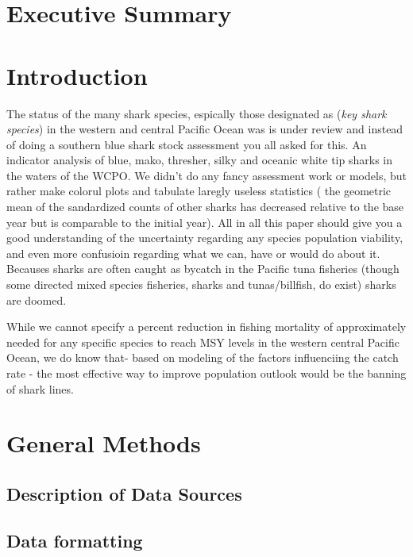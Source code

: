 \documentclass[12pt]{article}
\begin{document}
\wcpfctitlepage

\section*{Executive Summary}


\section{Introduction}
The status of the many  shark species, espically those designated as  (\emph{key shark species}) in the western and central Pacific Ocean was is under review and instead of doing a southern blue shark stock assessment you all asked for this. An indicator analysis of blue, mako, thresher, silky and oceanic white tip sharks in the waters of the WCPO. 
  We didn't do any fancy assessment work or models, but rather make colorul plots and tabulate laregly useless statistics ( the geometric mean of the sandardized counts of other sharks has decreased relative to the base year but is comparable to the initial year).  All in all this paper should give you a good understanding of the uncertainty regarding any species population viability, and even more confusioin regarding what we can, have or would do about it.  Becauses sharks are often caught as bycatch in the Pacific tuna fisheries (though some directed mixed species fisheries, sharks and tunas/billfish, do exist) sharks are doomed.
  
  While we cannot specify a percent  reduction in fishing mortality  of approximately  needed for any specific  species to reach  MSY levels in the western central Pacific Ocean, we do know that-  based on modeling of the factors influenciing the catch rate - the most effective way to improve population outlook   would be the banning of shark lines.



\section{General Methods}
        \subsection{Description of Data Sources}
         
\clearpage         
        \subsection{Data formatting}
\end{document}
